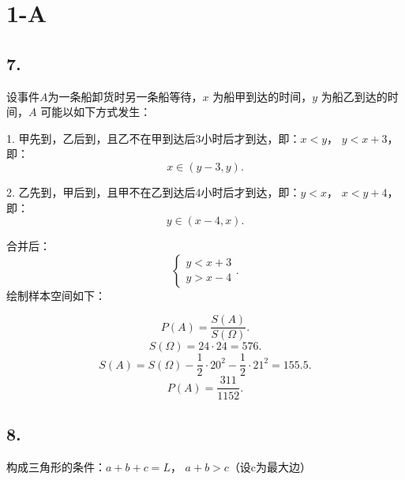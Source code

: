 \def\lecturer{李漫漫}
\def\noter{THF}
\def\className{Math Homework}
\def\term{III-B}



\section{1-A}%
\label{sec:1-A}
\subsection{7.}%
\label{sub:7.}
设事件$A$为一条船卸货时另一条船等待，$x$ 为船甲到达的时间，$y$ 为船乙到达的时间，$A$ 可能以如下方式发生：

1. 甲先到，乙后到，且乙不在甲到达后3小时后才到达，即：$x<y$， $y<x+3$，即：\[
    x\in \left( y-3,y \right) 
.\] 

2. 乙先到，甲后到，且甲不在乙到达后4小时后才到达，即：$y<x$， $x<y+4$，即：\[
    y\in \left( x-4,x \right) 
.\] 

合并后：\[
    \begin{cases}
        y<x+3\\
        y>x-4
    \end{cases}
.\] 
绘制样本空间如下：
\begin{center}
\end{center}
\[
    P\left( A \right) =\frac{S\left( A \right) }{S\left( \Omega \right) }
.\] 
\[
    S\left( \Omega \right) =24\cdot 24=576
.\] 
\[
    S\left( A \right) =S\left( \Omega \right) -\frac{1}{2}\cdot 20^2-\frac{1}{2}\cdot 21^2=155.5
.\] 
\[
    P\left( A \right) =\frac{311}{1152}
.\] 

\subsection{8.}%
\label{sub:8.}
构成三角形的条件：$a+b+c=L$， $a+b>c$（设c为最大边）
 
